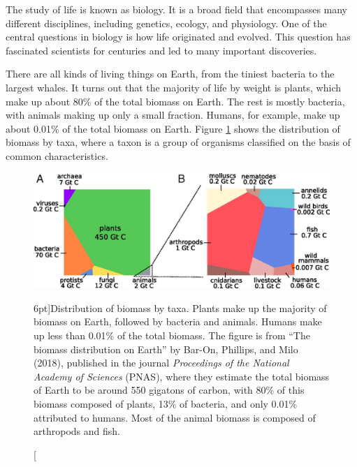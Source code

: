 The study of life is known as biology. It is a broad field that encompasses many different disciplines, including genetics, ecology, and physiology. One of the central questions in biology is how life originated and evolved. This question has fascinated scientists for centuries and led to many important discoveries.

There are all kinds of living things on Earth, from the tiniest bacteria to the largest whales. It turns out that the majority of life by weight is plants, which make up about 80\% of the total biomass on Earth. The rest is mostly bacteria, with animals making up only a small fraction. Humans, for example, make up about 0.01\% of the total biomass on Earth. Figure \ref{fig:biomass} shows the distribution of biomass by taxa, where a taxon is a group of organisms classified on the basis of common characteristics.

\begin{figure}
  \includegraphics{figs/molbiol/biomass.jpeg}
  \caption[][6pt]{Distribution of biomass by taxa. Plants make up the majority of biomass on Earth, followed by bacteria and animals. Humans make up less than 0.01\% of the total biomass. The figure is from ``The biomass distribution on Earth'' by Bar-On, Phillips, and Milo (2018), published in the journal {\em Proceedings of the National Academy of Sciences} (PNAS), where they estimate the total biomass of Earth to be around 550 gigatons of carbon, with 80\% of this biomass composed of plants, 13\% of bacteria, and only 0.01\% attributed to humans. Most of the animal biomass is composed of arthropods and fish.}
  \label{fig:biomass}
\end{figure}

